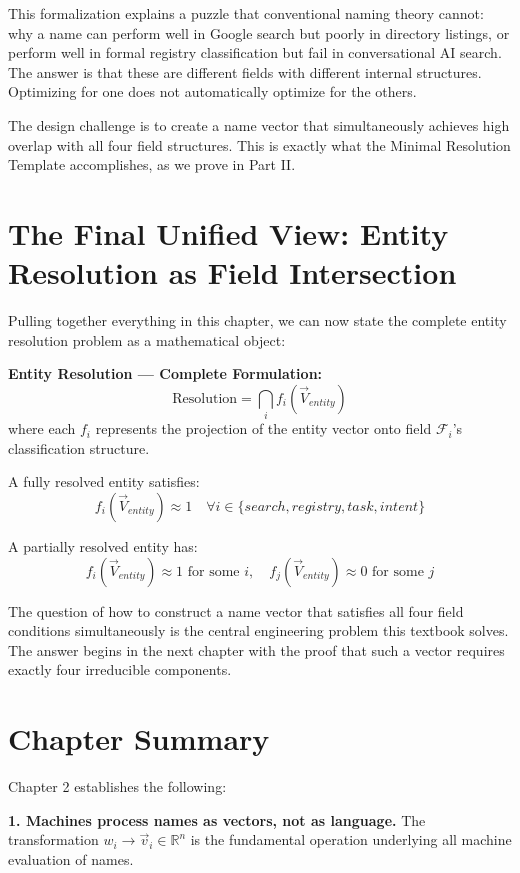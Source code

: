 \documentclass[12pt, openany]{book}
\theoremstyle{thmstyle}
\theoremstyle{defstyle}
\begin{document}
This formalization explains a puzzle that conventional naming theory cannot: why a name can perform well in Google search but poorly in directory listings, or perform well in formal registry classification but fail in conversational AI search. The answer is that these are different fields with different internal structures. Optimizing for one does not automatically optimize for the others.

The design challenge is to create a name vector that simultaneously achieves high overlap with all four field structures. This is exactly what the Minimal Resolution Template accomplishes, as we prove in Part II.

\section{The Final Unified View: Entity Resolution as Field Intersection}

Pulling together everything in this chapter, we can now state the complete entity resolution problem as a mathematical object:

\begin{equationbox}
\textbf{Entity Resolution --- Complete Formulation:}
\[
\text{Resolution} = \bigcap_i f_i(\vec{V}_{entity})
\]
where each $f_i$ represents the projection of the entity vector onto field $\mathcal{F}_i$'s classification structure.

A fully resolved entity satisfies:
\[
f_i(\vec{V}_{entity}) \approx 1 \quad \forall i \in \{search, registry, task, intent\}
\]

A partially resolved entity has:
\[
f_i(\vec{V}_{entity}) \approx 1 \text{ for some } i, \quad f_j(\vec{V}_{entity}) \approx 0 \text{ for some } j
\]
\end{equationbox}

The question of how to construct a name vector that satisfies all four field conditions simultaneously is the central engineering problem this textbook solves. The answer begins in the next chapter with the proof that such a vector requires exactly four irreducible components.

\section{Chapter Summary}

Chapter 2 establishes the following:

\textbf{1. Machines process names as vectors, not as language.} The transformation $w_i \rightarrow \vec{v}_i \in \mathbb{R}^n$ is the fundamental operation underlying all machine evaluation of names.
\end{document}
